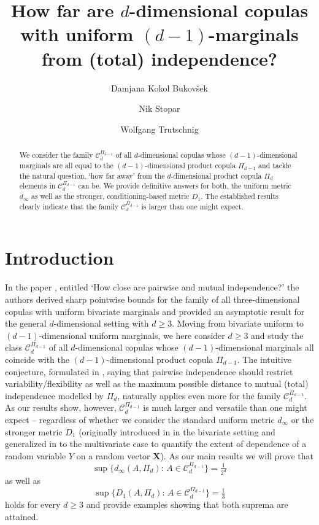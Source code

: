 \documentclass[12pt,a4paper]{amsart}
\title[Independence vs. marginal independence]{How far are $d$-dimensional copulas 
with uniform $(d-1)$-marginals from (total) independence?}
\author[D. Kokol Bukovšek]{Damjana Kokol Bukovšek \orcidlink{0000-0002-0098-6784} }
\author[N. Stopar]{Nik Stopar \orcidlink{0000-0002-0004-4957} }
\author[W. Trutschnig]{Wolfgang Trutschnig \orcidlink{0000-0002-7131-1944} }
\theoremstyle{definition}
\newcommand{\kc}{\mathcal{C}}
\begin{document}
\begin{abstract}
We consider the family $\kc_d^{\Pi_{d-1}}$ of all $d$-dimensional copulas 
whose $(d-1)$-dimensional marginals are all equal to the $(d-1)$-dimensional 
product copula $\Pi_{d-1}$ and tackle the natural question, `how far away' from the 
$d$-dimensional product copula $\Pi_d$ elements in $\kc_d^{\Pi_{d-1}}$ can be.
We provide definitive answers for both, the uniform metric $d_\infty$ as well 
as the stronger, conditioning-based metric $D_1$. The established results clearly indicate that the family $\kc_d^{\Pi_{d-1}}$
is larger than one might expect.  
\end{abstract}

\maketitle

\section{Introduction}

In the paper \cite{NeUb12}, entitled `How close are pairwise and mutual independence?' 
the authors derived sharp pointwise bounds for the fa\-mily of 
all three-dimensional copulas with uniform bivariate marginals and provided 
an asymptotic result for the general $d$-dimensional setting with  $d\geq3$. 
Moving from bivariate uniform to $(d-1)$-dimensional uniform marginals, we here consider 
$d \geq 3$ and study the class
$\kc_d^{\Pi_{d-1}}$ of all $d$-dimensional copulas 
whose $(d-1)$-dimensional marginals all coincide with the \mbox{$(d-1)$}-dimensional 
product copula $\Pi_{d-1}$. 
The intuitive conjecture, formulated in \cite{NeUb12}, saying  
that pairwise independence should restrict variability/flexibility as well as 
the maximum possible distance to mutual (total) independence modelled by 
$\Pi_d$, naturally applies even more for the family $\kc_d^{\Pi_{d-1}}$. 
As our results show, however, $\kc_d^{\Pi_{d-1}}$ is much larger and versatile  
than one might expect -- 
regardless of whether we consider the standard uniform metric $d_\infty$ or 
the stronger metric $D_1$ (originally introduced in \cite{tru11} in the bivariate setting and generalized in \cite{GJT} to the multivariate case
to quantify the extent of dependence of a random variable $Y$ on a random vector $\mathbf{X}$).
As our main results we will prove that
$$
\sup\Big\{d_\infty(A,\Pi_d):\, A \in \kc_d^{\Pi_{d-1}}\Big\}=\tfrac{1}{2^d}
$$
as well as 
$$
\sup\Big\{D_1(A,\Pi_d):\, A \in \kc_d^{\Pi_{d-1}}\Big\}=\tfrac{1}{3}
$$
holds for every $d \geq 3$ and provide examples showing that both suprema are attained.
\end{document}
